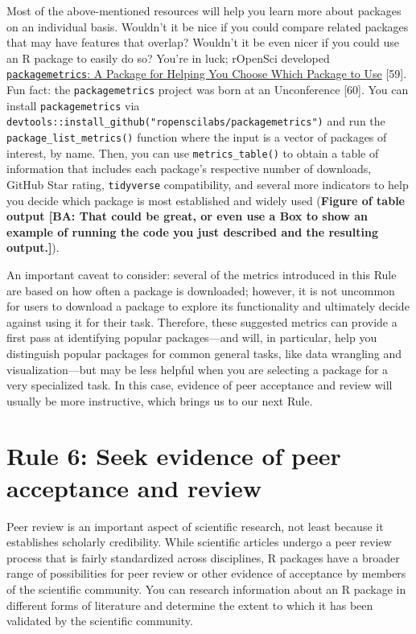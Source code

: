\documentclass[10pt,letterpaper]{article}
\begin{document}
Most of the above-mentioned resources will help you learn more about
packages on an individual basis. Wouldn't it be nice if you could
compare related packages that may have features that overlap? Wouldn't
it be even nicer if you could use an R package to easily do so? You're
in luck; rOpenSci developed
\href{https://docs.ropensci.org/packagemetrics/}{\texttt{packagemetrics}:
A Package for Helping You Choose Which Package to Use} {[}59{]}. Fun
fact: the \texttt{packagemetrics} project was born at an Unconference
{[}60{]}. You can install \texttt{packagemetrics} via
\texttt{devtools::install\_github("ropenscilabs/packagemetrics")} and
run the \texttt{package\_list\_metrics()} function where the input is a
vector of packages of interest, by name. Then, you can use
\texttt{metrics\_table()} to obtain a table of information that includes
each package's respective number of downloads, GitHub Star rating,
\texttt{tidyverse} compatibility, and several more indicators to help
you decide which package is most established and widely used
(\textbf{Figure of table output {[}BA: That could be great, or even use
a Box to show an example of running the code you just described and the
resulting output.{]}}).

An important caveat to consider: several of the metrics introduced in
this Rule are based on how often a package is downloaded; however, it is
not uncommon for users to download a package to explore its
functionality and ultimately decide against using it for their task.
Therefore, these suggested metrics can provide a first pass at
identifying popular packages---and will, in particular, help you
distinguish popular packages for common general tasks, like data
wrangling and visualization---but may be less helpful when you are
selecting a package for a very specialized task. In this case, evidence
of peer acceptance and review will usually be more instructive, which
brings us to our next Rule.

\hypertarget{rule-6-seek-evidence-of-peer-acceptance-and-review}{%
\section{Rule 6: Seek evidence of peer acceptance and
review}\label{rule-6-seek-evidence-of-peer-acceptance-and-review}}

Peer review is an important aspect of scientific research, not least
because it establishes scholarly credibility. While scientific articles
undergo a peer review process that is fairly standardized across
disciplines, R packages have a broader range of possibilities for peer
review or other evidence of acceptance by members of the scientific
community. You can research information about an R package in different
forms of literature and determine the extent to which it has been
validated by the scientific community.
\end{document}
